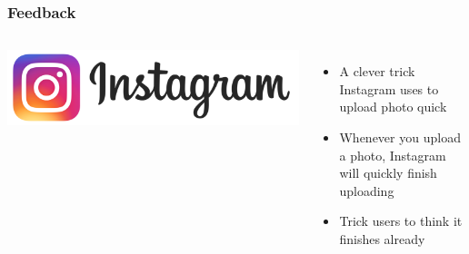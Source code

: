 \documentclass{beamer}
\begin{document}
\begin{frame}
\frametitle{Feedback}

\begin{columns}[c] %
	
	\includegraphics[width=1\linewidth]{instagram}
	
	\begin{itemize}
		\item A clever trick Instagram uses to upload photo quick
		\item Whenever you upload a photo, Instagram will quickly finish uploading
		\item Trick users to think it finishes already
	\end{itemize}
\end{columns}
\end{frame}
\end{document}
